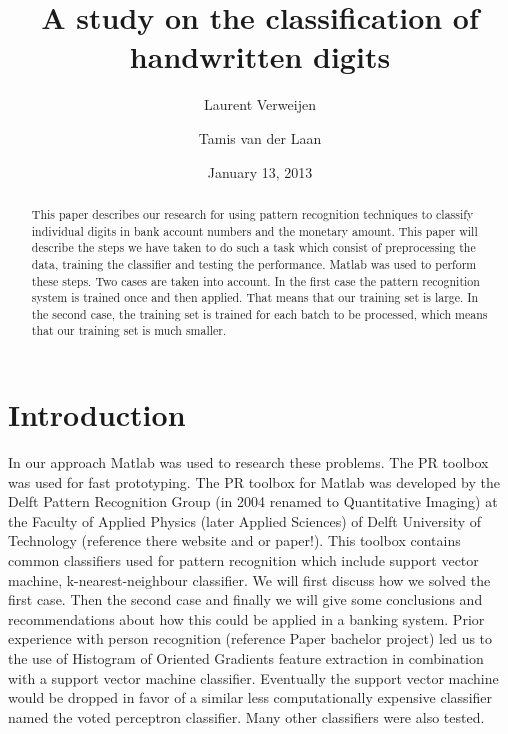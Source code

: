 \documentclass[%
        compressed,
        final,
        notitlepage,
        narroweqnarray,
        inline,
        twoside,
        ]{ieee}
\title{A study on the classification of handwritten digits}
\author{Laurent Verweijen \and Tamis van der Laan}
\date{January 13, 2013}
\begin{document}
\maketitle

\begin{abstract}
    This paper describes our research for using pattern recognition techniques
    to classify individual digits in bank account numbers and the monetary
    amount. This paper will describe the steps we have taken to do such a task
    which consist of preprocessing the data, training the classifier and testing
    the performance. Matlab was used to perform these steps. Two cases are taken
    into account. In the first case the pattern recognition system is trained
    once and then applied. That means that our training set is large. In the
    second case, the training set is trained for each batch to be processed,
    which means that our training set is much smaller.
\end{abstract}

\section{Introduction}

In our approach Matlab was used to research these problems. The PR toolbox was
used for fast prototyping. The PR toolbox for Matlab was developed by the Delft
Pattern Recognition Group (in 2004 renamed to Quantitative Imaging) at the
Faculty of Applied Physics (later Applied Sciences) of Delft University of
Technology (reference there website and or paper!). %
This toolbox contains common classifiers used for pattern recognition which
include support vector machine, k-nearest-neighbour classifier. We will first
discuss how we solved the first case. Then the second case and finally we will
give some conclusions and recommendations about how this could be applied in a
banking system. Prior experience with person recognition (reference Paper
bachelor project) led us to the use of Histogram of Oriented Gradients feature
extraction in combination with a support vector machine classifier. Eventually
the support vector machine would be dropped in favor of a similar less
computationally expensive classifier named the voted perceptron classifier. Many
other classifiers were also tested.
\end{document}
